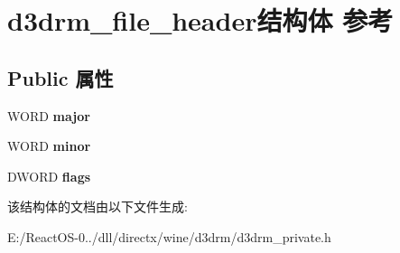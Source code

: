 \hypertarget{structd3drm__file__header}{}\section{d3drm\+\_\+file\+\_\+header结构体 参考}
\label{structd3drm__file__header}
\subsection*{Public 属性}
\begin{DoxyCompactItemize}
\item 
\mbox{\label{structd3drm__file__header_ad606dd3442eda9c960264df7b9ffad4d}} 
W\+O\+RD {\bfseries major}
\item 
\mbox{\label{structd3drm__file__header_af475776a71466a2424d2118cbb0ed942}} 
W\+O\+RD {\bfseries minor}
\item 
\mbox{\label{structd3drm__file__header_abe85051b32dc7ae326feab71ecdb2931}} 
D\+W\+O\+RD {\bfseries flags}
\end{DoxyCompactItemize}


该结构体的文档由以下文件生成\+:\begin{DoxyCompactItemize}
\item 
E\+:/\+React\+O\+S-\/0../dll/directx/wine/d3drm/d3drm\+\_\+private.\+h\end{DoxyCompactItemize}

